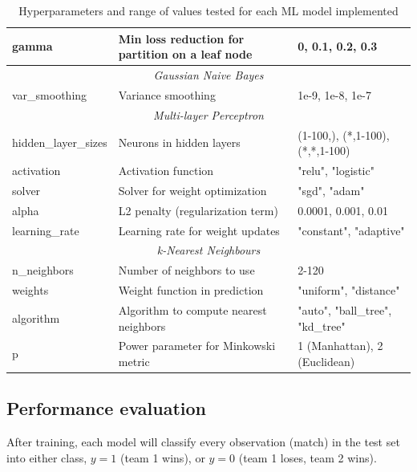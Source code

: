 \begin{table}[h]
\begin{adjustbox}{center}
\begin{tabular}{|l|l|l|}
 		gamma & Min loss reduction for partition on a leaf node & 0, 0.1, 0.2, 0.3 \\
 		\hline
 		\multicolumn{3}{|c|}{\rule{0pt}{2.5ex}\textit{Gaussian Naive Bayes}} \\
 		\hline
 		var\_smoothing & Variance smoothing & 1e-9, 1e-8, 1e-7 \\
 		\hline
 		\multicolumn{3}{|c|}{\rule{0pt}{2.5ex}\textit{Multi-layer Perceptron}} \\
 		\hline
 		hidden\_layer\_sizes & Neurons in hidden layers & (1-100,), (*,1-100), (*,*,1-100)\footnotemark[3] \\
 		activation & Activation function & "relu", "logistic" \\
 		solver & Solver for weight optimization & "sgd", "adam" \\
 		alpha & L2 penalty (regularization term) & 0.0001, 0.001, 0.01 \\
 		learning\_rate & Learning rate for weight updates & "constant", "adaptive" \\
 		\hline
  		\multicolumn{3}{|c|}{\rule{0pt}{2.5ex}\textit{k-Nearest Neighbours}} \\
		\hline
		n\_neighbors & Number of neighbors to use & 2-120 \\
		weights & Weight function in prediction & "uniform", "distance" \\
		algorithm & Algorithm to compute nearest neighbors & "auto", "ball\_tree", "kd\_tree" \\
		p & Power parameter for Minkowski metric & 1 (Manhattan), 2 (Euclidean) \\
		\hline
 	\end{tabular}
 	 	\end{adjustbox}
 	
 	\caption{Hyperparameters and range of values tested for each ML model implemented}
 	\label{table:hyperparameters}
 \end{table}
 

\clearpage

\subsection{Performance evaluation}

After training, each model will classify every observation (match) in the test set into either class, $y=1$ (team 1 wins), or $y=0$ (team 1 loses, team 2 wins). 

